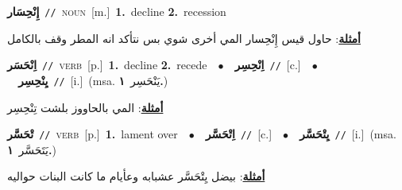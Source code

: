 \documentclass[10pt,a4paper,twoside]{article} %
\begin{document}
\begin{multicols}{2}
{\setlength\topsep{0pt}\textbf{\foreignlanguage{arabic}{إِنْحِسَار}}\ {\color{gray}\texttt{//}\color{black}}\ \textsc{noun}\ [m.]\ \textbf{1.}~decline  \textbf{2.}~recession\  \begin{flushright}\color{gray}\foreignlanguage{arabic}{\textbf{\underline{\foreignlanguage{arabic}{أمثلة}}}: حاول قيس إِنْحِسار المي أخرى شوي بس نتأكد انه المطر وقف بالكامل}\end{flushright}\color{black}} \vspace{2mm}

{\setlength\topsep{0pt}\textbf{\foreignlanguage{arabic}{اِنْحَسَر}}\ {\color{gray}\texttt{//}\color{black}}\ \textsc{verb}\ [p.]\ \textbf{1.}~decline  \textbf{2.}~recede\ \ $\bullet$\ \ \setlength\topsep{0pt}\textbf{\foreignlanguage{arabic}{اِنْحِسِر}}\ {\color{gray}\texttt{//}\color{black}}\ [c.]\ \ $\bullet$\ \ \setlength\topsep{0pt}\textbf{\foreignlanguage{arabic}{يِنْحِسِر}}\ {\color{gray}\texttt{//}\color{black}}\ [i.]\ \color{gray}(msa. \foreignlanguage{arabic}{يَنْحَسِر}~\foreignlanguage{arabic}{\textbf{١.}})\color{black}\  \begin{flushright}\color{gray}\foreignlanguage{arabic}{\textbf{\underline{\foreignlanguage{arabic}{أمثلة}}}: المي بالحاووز بلشت تِنْحِسِر}\end{flushright}\color{black}} \vspace{2mm}

{\setlength\topsep{0pt}\textbf{\foreignlanguage{arabic}{تْحَسَّر}}\ {\color{gray}\texttt{//}\color{black}}\ \textsc{verb}\ [p.]\ \textbf{1.}~lament over\ \ $\bullet$\ \ \setlength\topsep{0pt}\textbf{\foreignlanguage{arabic}{اِتْحَسَّر}}\ {\color{gray}\texttt{//}\color{black}}\ [c.]\ \ $\bullet$\ \ \setlength\topsep{0pt}\textbf{\foreignlanguage{arabic}{يِتْحَسَّر}}\ {\color{gray}\texttt{//}\color{black}}\ [i.]\ \color{gray}(msa. \foreignlanguage{arabic}{يَتَحَسَّر}~\foreignlanguage{arabic}{\textbf{١.}})\color{black}\  \begin{flushright}\color{gray}\foreignlanguage{arabic}{\textbf{\underline{\foreignlanguage{arabic}{أمثلة}}}: بيضل يِتْحَسَّر عشبابه وعأيام ما كانت البنات حواليه}\end{flushright}\color{black}} \vspace{2mm}


\end{multicols}
\end{document}
